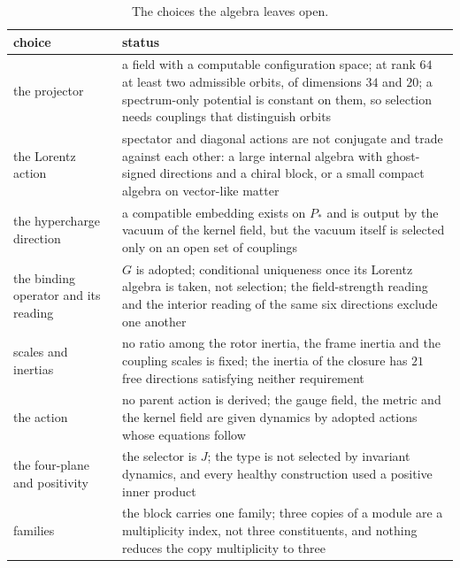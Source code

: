 \begin{table}[t]
\centering
\small
\begin{tabular}{@{}>{\raggedright\arraybackslash}p{4.0cm}>{\raggedright\arraybackslash}p{10.4cm}@{}}
\toprule
choice & status\\
\midrule
the projector & a field with a computable configuration space; at rank $64$ at least two admissible orbits, of dimensions $34$ and $20$; a spectrum-only potential is constant on
them, so selection needs couplings that distinguish orbits\\
the Lorentz action & spectator and diagonal actions are not conjugate and trade against each other: a large internal algebra with ghost-signed directions and a chiral block,
or a small compact algebra on vector-like matter\\
the hypercharge direction & a compatible embedding exists on $P_*$ and is output by the vacuum of the kernel field, but the vacuum itself is selected only on an open set of
couplings\\
the binding operator and its reading & $G$ is adopted; conditional uniqueness once its Lorentz algebra is taken, not selection; the field-strength reading and the interior reading
of the same six directions exclude one another\\
scales and inertias & no ratio among the rotor inertia, the frame inertia and the coupling scales is fixed; the inertia of the closure has $21$ free directions satisfying neither
requirement\\
the action & no parent action is derived; the gauge field, the metric and the kernel field are given dynamics by adopted actions whose equations follow\\
the four-plane and positivity & the selector is $J$; the type is not selected by invariant dynamics, and every healthy construction used a positive inner product\\
families & the block carries one family; three copies of a module are a multiplicity index, not three constituents, and nothing reduces the copy multiplicity to three\\
\bottomrule
\end{tabular}
\caption{The choices the algebra leaves open.}
\label{tab:choices}
\end{table}

